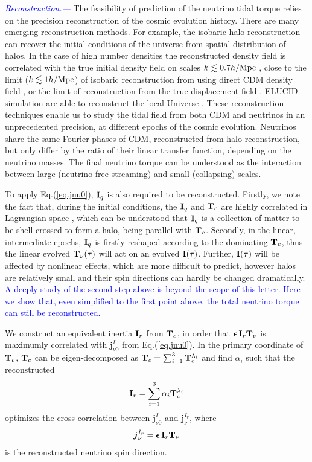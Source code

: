 \documentclass[aps,prd,twocolumn,amsmath,amssymb,amsfont,superscriptaddress]{revtex4-1}
\newcommand{\bs}{\boldsymbol}
\newcommand{\T}{\bold{T}}
\newcommand{\I}{\bold{I}}
\newcommand{\spin}{\bs{j}}
\newcommand{\tcb}{\textcolor{blue}}
\begin{document}
\tcb{\textit{Reconstruction.---}} 
The feasibility of prediction of the neutrino tidal torque relies on the precision reconstruction of the cosmic evolution history. 
There are many emerging reconstruction methods. 
For example, the isobaric halo reconstruction can recover the initial conditions of the universe from spatial distribution of halos. 
In the case of high number densities the reconstructed density field is correlated with the true initial density field on scales $k\lesssim 0.7 h/{\rm Mpc}$ \citep{2017ApJ...847..110Y}, 
close to the limit ($k\lesssim 1 h/{\rm Mpc}$) of isobaric reconstruction from using direct CDM density field \citep{2017PhRvD..96l3502Z}, 
or the limit of reconstruction from the true displacement field \citep{2017PhRvD..95d3501Y}. 
ELUCID simulation are able to reconstruct the local Universe \citep{2014ApJ...794...94W}.
These reconstruction techniques enable us to study the tidal field from both CDM and neutrinos in an unprecedented precision, at different epochs of the cosmic evolution. 
Neutrinos share the same Fourier phases of CDM, reconstructed from halo reconstruction, but only differ by the ratio of their linear transfer function, depending on the neutrino masses.
The final neutrino torque can be understood as the interaction between large (neutrino free streaming) and small (collapsing) scales.

To apply Eq.(\ref{eq.jnu0}), $\I_q$ is also required to be reconstructed. 
Firstly, we note the fact that, during the initial conditions, the $\I_q$ and $\T_c$ are highly correlated in Lagrangian space \citep{2000ApJ...532L...5L,2001ApJ...555..106L}, 
which can be understood that $\I_q$ is a collection of matter to be shell-crossed to form a halo, being parallel with $\T_c$.
Secondly, in the linear, intermediate epochs, $\I_q$ is firstly reshaped according to the dominating $\T_c$, thus the linear evolved $\T_\nu(\tau)$ will act on an evolved $\I(\tau)$.
Further, $\I(\tau)$ will be affected by nonlinear effects, which are more difficult to predict, however halos are relatively small and their spin directions can hardly be changed dramatically.
\tcb{A deeply study of the second step above is beyond the scope of this letter. Here we show that, even simplified to the first point above, the total neutrino torque can still be reconstructed.}

We construct an equivalent inertia $\I_r$ from $\T_c$, in order that $\bs{\epsilon}\,\I_r\T_\nu$ is maximumly correlated with $\spin^I_{\nu 0}$ from Eq.(\ref{eq.jnu0}).
In the primary coordinate of $\T_c$, $\T_c$ can be eigen-decomposed as $\T_c=\sum_{i=1}^3\T^{\lambda_i}_c$ and find $\alpha_i$ such that the reconstructed
\begin{equation}\label{eq.Ir}
	\I_r=\sum_{i=1}^3\alpha_i\T^{\lambda_i}_c
\end{equation}
optimizes the cross-correlation between $\spin^I_{\nu 0}$ and $\spin^{I_r}_\nu$, where
\begin{equation}\label{eq.jnuIr}
 	\spin^{I_r}_\nu=\bs{\epsilon}\,\I_r\T_\nu
\end{equation}
is the reconstructed neutrino spin direction.
\end{document}
